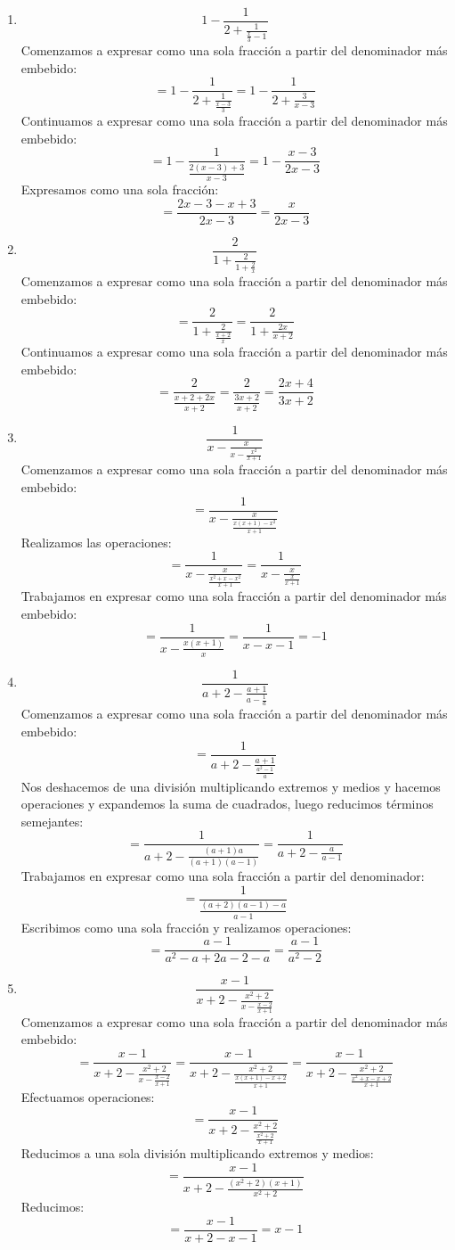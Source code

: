 \documentclass[12pt]{article}
\begin{document}
\begin{enumerate}[label=\bfseries Ejercicio \arabic*:]
Comenzamos a expresar como una sola fracción a partir del denominador más embebido:
$$= \frac{1}{1 + \frac{1}{\frac{x - 1}{x}}} = \frac{1}{1 + \frac{x}{x - 1}}$$
Continuamos a expresar como una sola fracción a partir del denominador más embebido:
$$= \frac{1}{\frac{x - 1 + x}{x - 1}} = \frac{1}{\frac{2x - 1}{x - 1}} = \frac{x - 1}{2x - 1}$$
  \item $$1 - \frac{1}{2 + \frac{1}{\frac{x}{3} - 1}}$$
Comenzamos a expresar como una sola fracción a partir del denominador más embebido:
$$= 1 - \frac{1}{2 + \frac{1}{\frac{x- 3}{3}}} = 1 - \frac{1}{2 + \frac{3}{x- 3}}$$
Continuamos a expresar como una sola fracción a partir del denominador más embebido:
$$= 1 - \frac{1}{\frac{2(x - 3) + 3}{x- 3}} = 1 - \frac{x- 3}{2x - 3}$$
Expresamos como una sola fracción:
$$= \frac{2x - 3 - x + 3}{2x - 3} = \frac{x}{2x - 3}$$
  \item $$\frac{2}{1 + \frac{2}{1 + \frac{2}{x}}}$$
Comenzamos a expresar como una sola fracción a partir del denominador más embebido:
$$= \frac{2}{1 + \frac{2}{\frac{x + 2}{x}}} = \frac{2}{1 + \frac{2x}{x + 2}}$$
Continuamos a expresar como una sola fracción a partir del denominador más embebido:
$$= \frac{2}{\frac{x + 2 + 2x}{x + 2}} = \frac{2}{\frac{3x + 2}{x + 2}} = \frac{2x + 4}{3x + 2}$$
  \item $$\frac{1}{x - \frac{x}{x - \frac{x^2}{x + 1}}}$$
Comenzamos a expresar como una sola fracción a partir del denominador más embebido:
$$= \frac{1}{x - \frac{x}{\frac{x(x + 1) - x^2}{x + 1}}}$$
Realizamos las operaciones:
$$= \frac{1}{x - \frac{x}{\frac{x^2 + x - x^2}{x + 1}}} = \frac{1}{x - \frac{x}{\frac{x}{x + 1}}}$$
Trabajamos en expresar como una sola fracción a partir del denominador más embebido:
$$= \frac{1}{x - \frac{x(x + 1)}{x}} = \frac{1}{x - x - 1} = - 1$$
  \item $$\frac{1}{a + 2 - \frac{a + 1}{a - \frac{1}{a}}}$$
Comenzamos a expresar como una sola fracción a partir del denominador más embebido:
$$= \frac{1}{a + 2 - \frac{a + 1}{\frac{a^2 - 1}{a}}}$$
Nos deshacemos de una división multiplicando extremos y medios y hacemos operaciones y expandemos la suma de  cuadrados, luego reducimos términos semejantes:
$$= \frac{1}{a + 2 - \frac{(a + 1)a}{(a + 1)(a - 1)}} = \frac{1}{a + 2 - \frac{a}{a - 1}}$$
Trabajamos en expresar como una sola fracción a partir del denominador:
$$= \frac{1}{\frac{(a + 2)(a - 1) - a}{a - 1}}$$
Escribimos como una sola fracción y realizamos operaciones:
$$= \frac{a - 1}{a^2 - a + 2a -2 -a} = \frac{a -1}{a^2 - 2}$$
  \item $$\frac{x - 1}{x + 2 - \frac{x^2 + 2}{x - \frac{x - 2}{x + 1}}}$$
Comenzamos a expresar como una sola fracción a partir del denominador más embebido:
$$= \frac{x - 1}{x + 2 - \frac{x^2 + 2}{x - \frac{x - 2}{x + 1}}} = \frac{x - 1}{x + 2 - \frac{x^2 + 2}{\frac{x(x + 1) - x + 2}{x + 1}}} = \frac{x - 1}{x + 2 - \frac{x^2 + 2}{\frac{x^2 + x - x + 2}{x + 1}}}$$
Efectuamos operaciones:
$$= \frac{x - 1}{x + 2 - \frac{x^2 + 2}{\frac{x^2 + 2}{x + 1}}}$$
Reducimos a una sola división multiplicando extremos y medios:
$$= \frac{x - 1}{x + 2 - \frac{(x^2 + 2)(x + 1)}{x^2 + 2}}$$
Reducimos:
$$= \frac{x - 1}{x + 2 - x - 1} = x - 1$$



\end{enumerate}
\end{document}
